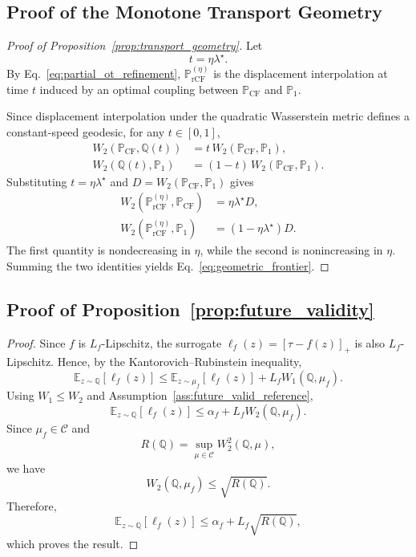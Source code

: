 \subsection{Proof of the Monotone Transport Geometry}
\label{app:transport_geometry}

\begin{proof}[Proof of Proposition~\ref{prop:transport_geometry}]
Let
\[
t=\eta\lambda^\star.
\]
By Eq.~\ref{eq:partial_ot_refinement},
$\mathbb{P}_{\mathrm{rCF}}^{(\eta)}$ is the displacement interpolation
at time $t$ induced by an optimal coupling between
$\mathbb{P}_{\mathrm{CF}}$ and $\mathbb{P}_1$.

Since displacement interpolation under the quadratic Wasserstein
metric defines a constant-speed geodesic, for any $t\in[0,1]$,
\begin{align}
W_2\!\left(
\mathbb{P}_{\mathrm{CF}},\mathbb{Q}(t)
\right)
&=
t\,W_2(\mathbb{P}_{\mathrm{CF}},\mathbb{P}_1),\\
W_2\!\left(
\mathbb{Q}(t),\mathbb{P}_1
\right)
&=
(1-t)\,W_2(\mathbb{P}_{\mathrm{CF}},\mathbb{P}_1).
\end{align}
Substituting $t=\eta\lambda^\star$ and
$D=W_2(\mathbb{P}_{\mathrm{CF}},\mathbb{P}_1)$ gives
\begin{align}
W_2\!\left(
\mathbb{P}_{\mathrm{rCF}}^{(\eta)},
\mathbb{P}_{\mathrm{CF}}
\right)
&=
\eta\lambda^\star D,\\
W_2\!\left(
\mathbb{P}_{\mathrm{rCF}}^{(\eta)},
\mathbb{P}_1
\right)
&=
(1-\eta\lambda^\star)D.
\end{align}
The first quantity is nondecreasing in $\eta$, while the second is
nonincreasing in $\eta$. Summing the two identities yields
Eq.~\ref{eq:geometric_frontier}.
\end{proof}


\subsection{Proof of Proposition~\ref{prop:future_validity}}
\label{app:future_validity}

\begin{proof}
Since $f$ is $L_f$-Lipschitz, the surrogate
$\ell_f(z)=[\tau-f(z)]_+$ is also $L_f$-Lipschitz. Hence, by the
Kantorovich--Rubinstein inequality,
\begin{equation}
\mathbb{E}_{z\sim\mathbb{Q}}[\ell_f(z)]
\le
\mathbb{E}_{z\sim\mu_f}[\ell_f(z)]
+
L_f W_1(\mathbb{Q},\mu_f).
\end{equation}
Using $W_1\le W_2$ and
Assumption~\ref{ass:future_valid_reference},
\begin{equation}
\mathbb{E}_{z\sim\mathbb{Q}}[\ell_f(z)]
\le
\alpha_f
+
L_f W_2(\mathbb{Q},\mu_f).
\end{equation}
Since $\mu_f\in\mathcal{C}$ and
\[
R(\mathbb{Q})
=
\sup_{\mu\in\mathcal{C}}
W_2^2(\mathbb{Q},\mu),
\]
we have
\[
W_2(\mathbb{Q},\mu_f)
\le
\sqrt{R(\mathbb{Q})}.
\]
Therefore,
\begin{equation}
\mathbb{E}_{z\sim\mathbb{Q}}[\ell_f(z)]
\le
\alpha_f
+
L_f\sqrt{R(\mathbb{Q})},
\end{equation}
which proves the result.
\end{proof}


